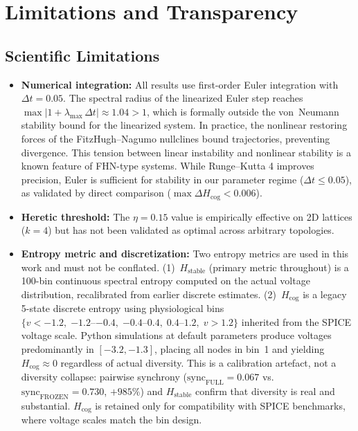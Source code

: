 \documentclass[11pt]{article}
\begin{document}
\section{Limitations and Transparency}
\label{sec:limitations}

\subsection{Scientific Limitations}
\begin{itemize}
\item \textbf{Numerical integration:} All results use first-order Euler integration with $\Delta t = 0.05$. The spectral radius of the linearized Euler step reaches $\max|1 + \lambda_{\max}\,\Delta t| \approx 1.04 > 1$, which is formally outside the von~Neumann stability bound for the linearized system. In practice, the nonlinear restoring forces of the FitzHugh--Nagumo nullclines bound trajectories, preventing divergence. This tension between linear instability and nonlinear stability is a known feature of FHN-type systems. While Runge--Kutta 4 improves precision, Euler is sufficient for stability in our parameter regime ($\Delta t \le 0.05$), as validated by direct comparison ($\max \Delta H_{\text{cog}} < 0.006$).
\item \textbf{Heretic threshold:} The $\eta = 0.15$ value is empirically effective on 2D lattices ($k = 4$) but has not been validated as optimal across arbitrary topologies.
\item \textbf{Entropy metric and discretization:} Two entropy metrics are used in this work and must not be conflated. (1)~$H_{\text{stable}}$ (primary metric throughout) is a 100-bin continuous spectral entropy computed on the actual voltage distribution, recalibrated from earlier discrete estimates. (2)~$H_{\text{cog}}$ is a legacy 5-state discrete entropy using physiological bins $\{v < -1.2,\; {-1.2}\text{--}{-0.4},\; {-0.4}\text{--}{0.4},\; {0.4}\text{--}{1.2},\; v > 1.2\}$ inherited from the SPICE voltage scale. Python simulations at default parameters produce voltages predominantly in $[-3.2, -1.3]$, placing all nodes in bin~1 and yielding $H_{\text{cog}} \approx 0$ regardless of actual diversity. This is a calibration artefact, not a diversity collapse: pairwise synchrony ($\text{sync}_{\text{FULL}} = 0.067$ vs.\ $\text{sync}_{\text{FROZEN}} = 0.730$, $+985\%$) and $H_{\text{stable}}$ confirm that diversity is real and substantial. $H_{\text{cog}}$ is retained only for compatibility with SPICE benchmarks, where voltage scales match the bin design.

\end{itemize}
\end{document}
